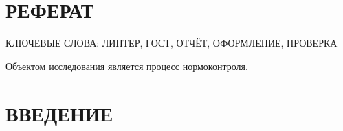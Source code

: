 \section*{РЕФЕРАТ} %

КЛЮЧЕВЫЕ СЛОВА: ЛИНТЕР, ГОСТ, ОТЧЁТ, ОФОРМЛЕНИЕ, ПРОВЕРКА

Объектом исследования является процесс нормоконтроля.

\section*{ВВЕДЕНИЕ}
